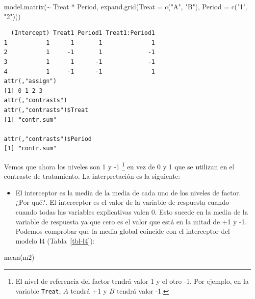 \documentclass[
  12pt,
  a4paper,
  extrafontsizes,
  onecolumn,
  openright]{memoir}
\newenvironment{Shaded}{\begin{snugshade}}{\end{snugshade}}
\newcommand{\AttributeTok}[1]{\textcolor[rgb]{0.40,0.45,0.13}{#1}}
\newcommand{\FunctionTok}[1]{\textcolor[rgb]{0.28,0.35,0.67}{#1}}
\newcommand{\NormalTok}[1]{\textcolor[rgb]{0.00,0.23,0.31}{#1}}
\newcommand{\SpecialCharTok}[1]{\textcolor[rgb]{0.37,0.37,0.37}{#1}}
\newcommand{\StringTok}[1]{\textcolor[rgb]{0.13,0.47,0.30}{#1}}
\providecommand{\tightlist}{%
  \setlength{\itemsep}{0pt}\setlength{\parskip}{0pt}}\usepackage{longtable,booktabs,array}
\begin{document}
\scriptsize

\begin{Shaded}
\begin{Highlighting}[]
\FunctionTok{model.matrix}\NormalTok{(}\SpecialCharTok{\textasciitilde{}}\NormalTok{ Treat }\SpecialCharTok{*}\NormalTok{ Period, }\FunctionTok{expand.grid}\NormalTok{(}\AttributeTok{Treat =} \FunctionTok{c}\NormalTok{(}\StringTok{"A"}\NormalTok{, }\StringTok{"B"}\NormalTok{), }\AttributeTok{Period =} \FunctionTok{c}\NormalTok{(}\StringTok{"1"}\NormalTok{, }\StringTok{"2"}\NormalTok{)))}
\end{Highlighting}
\end{Shaded}

\begin{verbatim}
  (Intercept) Treat1 Period1 Treat1:Period1
1           1      1       1              1
2           1     -1       1             -1
3           1      1      -1             -1
4           1     -1      -1              1
attr(,"assign")
[1] 0 1 2 3
attr(,"contrasts")
attr(,"contrasts")$Treat
[1] "contr.sum"

attr(,"contrasts")$Period
[1] "contr.sum"
\end{verbatim}

\normalsize

Vemos que ahora los niveles son 1 y -1 \footnote{El nivel de referencia
  del factor tendrá valor 1 y el otro -1. Por ejemplo, en la variable
  \texttt{Treat}, \(A\) tendrá +1 y \(B\) tendrá valor -1.} en vez de 0
y 1 que se utilizan en el contraste de tratamiento. La interpretación es
la siguiente:

\begin{itemize}
\tightlist
\item
  El interceptor es la media de la media de cada uno de los niveles de
  factor. ¿Por qué?. El interceptor es el valor de la variable de
  respuesta cuando cuando todas las variables explicativas valen 0. Esto
  sucede en la media de la variable de respuesta ya que cero es el valor
  que está en la mitad de +1 y -1. Podemos comprobar que la media global
  coincide con el interceptor del modelo l4 (Tabla~\ref{tbl-l4}):
\end{itemize}

\scriptsize

\begin{Shaded}
\begin{Highlighting}[]
\FunctionTok{mean}\NormalTok{(m2)}
\end{Highlighting}
\end{Shaded}
\end{document}
